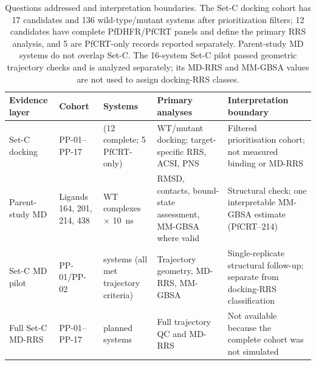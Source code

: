 \begin{table}[htbp]
\centering
\caption{Questions addressed and interpretation boundaries. The Set-C docking cohort has 17 candidates and 136 wild-type/mutant systems after prioritization filters; 12 candidates have complete PfDHFR/PfCRT panels and define the primary RRS analysis, and 5 are PfCRT-only records reported separately. Parent-study MD systems do not overlap Set-C. The 16-system Set-C pilot passed geometric trajectory checks and is analyzed separately; its MD-RRS and MM-GBSA values are not used to assign docking-RRS classes.}
\label{tab:s6_cohort_estimands}
\scriptsize
\begin{tabularx}{\textwidth}{>{\raggedright\arraybackslash}p{} >{\raggedright\arraybackslash}p{} >{\raggedright\arraybackslash}p{} >{\raggedright\arraybackslash}X >{\raggedright\arraybackslash}X}
\toprule
Evidence layer & Cohort & Systems & Primary analyses & Interpretation boundary \\
\midrule
Set-C docking & PP-01--PP-17 & 136 (12 complete; 5 PfCRT-only) & WT/mutant docking; target-specific RRS, ACSI, PNS & Filtered prioritisation cohort; not measured binding or MD-RRS \\
Parent-study MD & Ligands 164, 201, 214, 438 & 4 WT complexes $\times$ \SI{10}{\nano\second} & RMSD, contacts, bound-state assessment, MM-GBSA where valid & Structural check; one interpretable MM-GBSA estimate (PfCRT--214) \\
Set-C MD pilot & PP-01/PP-02 & 16 systems (all met trajectory criteria) & Trajectory geometry, MD-RRS, MM-GBSA & Single-replicate structural follow-up; separate from docking-RRS classification \\
Full Set-C MD-RRS & PP-01--PP-17 & 136 planned systems & Full trajectory QC and MD-RRS & Not available because the complete cohort was not simulated \\
\bottomrule
\end{tabularx}
\end{table}

